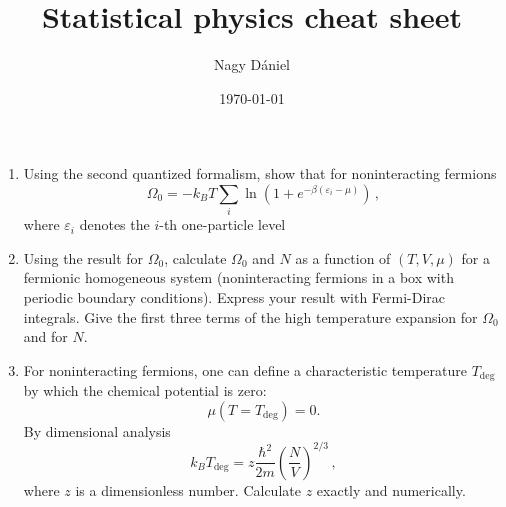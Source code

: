 \documentclass[11pt, a4paper]{article}
\title{Statistical physics cheat sheet}
\author{Nagy Dániel}
\date{\today}
\begin{document}
\maketitle
\newpage

\begin{enumerate}
    \item Using the second quantized formalism, show that for noninteracting fermions
    \begin{equation*}
        \Omega_0 = -k_BT\sum\limits_i \ln \left(1 + e^{-\beta(\varepsilon_i - \mu)}\right)\,,
    \end{equation*}
    where $\varepsilon_i$ denotes the $i$-th one-particle level
    
    \item Using the result for $\Omega_0$, calculate $\Omega_0$ and $N$ as a function of $(T,V,\mu)$
    for a fermionic homogeneous system (noninteracting fermions in a box with periodic boundary
    conditions). Express your result with Fermi-Dirac integrals. Give the first three terms of the
    high temperature expansion for $\Omega_0$ and for $N$.
    
    \item For noninteracting fermions, one can define a characteristic temperature $T_{\textrm{deg}}$
    by which the chemical potential is zero:
    \begin{equation*}
        \mu(T=T_{\textrm{deg}}) = 0.
    \end{equation*}
    By dimensional analysis
    \begin{equation*}
        k_BT_{\textrm{deg}} = z \frac{\hbar^2}{2m}\left(\frac{N}{V}\right)^{2/3}\,,
    \end{equation*}
    where $z$ is a dimensionless number. Calculate $z$ exactly and numerically.


\end{enumerate}
\end{document}
